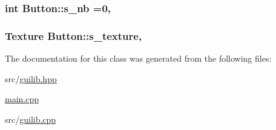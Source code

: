 \subsubsection[{\texorpdfstring{s\+\_\+nb}{s_nb}}]{\setlength{\rightskip}{0pt plus 5cm}int Button\+::s\+\_\+nb =0\hspace{0.3cm}{\ttfamily [static]}, {\ttfamily [private]}}\hypertarget{class_button_a15879fddc562e8dcf81fe8dcb01f600c}{}\label{class_button_a15879fddc562e8dcf81fe8dcb01f600c}
\subsubsection[{\texorpdfstring{s\+\_\+texture}{s_texture}}]{\setlength{\rightskip}{0pt plus 5cm}Texture Button\+::s\+\_\+texture\hspace{0.3cm}{\ttfamily [static]}, {\ttfamily [private]}}\hypertarget{class_button_aa9a490bc7d0d3f7d39c3116e4148f789}{}\label{class_button_aa9a490bc7d0d3f7d39c3116e4148f789}


The documentation for this class was generated from the following files\+:\begin{DoxyCompactItemize}
\item 
src/\hyperlink{guilib_8hpp}{guilib.\+hpp}\item 
\hyperlink{main_8cpp}{main.\+cpp}\item 
src/\hyperlink{guilib_8cpp}{guilib.\+cpp}\end{DoxyCompactItemize}
